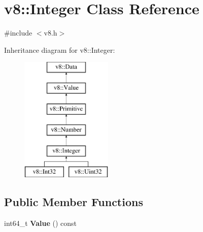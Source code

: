 \hypertarget{classv8_1_1_integer}{}\section{v8\+:\+:Integer Class Reference}
\label{classv8_1_1_integer}


{\ttfamily \#include $<$v8.\+h$>$}

Inheritance diagram for v8\+:\+:Integer\+:\begin{figure}[H]
\begin{center}
\leavevmode
\includegraphics[height=6.000000cm]{classv8_1_1_integer}
\end{center}
\end{figure}
\subsection*{Public Member Functions}
\begin{DoxyCompactItemize}
\item 
int64\+\_\+t {\bfseries Value} () const \hypertarget{classv8_1_1_integer_a93bcfb39090631a3ff95843463183c9c}{}\label{classv8_1_1_integer_a93bcfb39090631a3ff95843463183c9c}

\end{DoxyCompactItemize}
